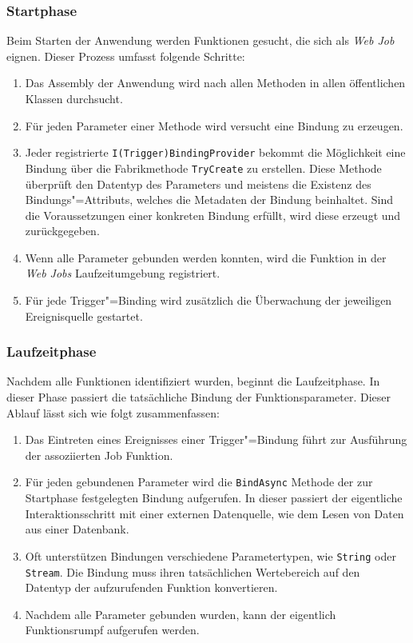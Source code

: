 \subsubsection{Startphase}

Beim Starten der Anwendung werden Funktionen gesucht, die sich als \textit{Web Job} eignen. Dieser Prozess umfasst folgende Schritte:

\begin{enumerate}
	\item Das Assembly der Anwendung wird nach allen Methoden in allen öffentlichen Klassen durchsucht.
	\item Für jeden Parameter einer Methode wird versucht eine Bindung zu erzeugen.
	\item Jeder registrierte \lstinline{I(Trigger)BindingProvider} bekommt die Möglichkeit eine Bindung über die Fabrikmethode \lstinline{TryCreate} zu erstellen. Diese Methode überprüft den Datentyp des Parameters und meistens die Existenz des Bindungs"=Attributs, welches die Metadaten der Bindung beinhaltet. Sind die Voraussetzungen einer konkreten Bindung erfüllt, wird diese erzeugt und zurückgegeben.
	\item Wenn alle Parameter gebunden werden konnten, wird die Funktion in der \textit{Web Jobs} Laufzeitumgebung registriert.
	\item Für jede Trigger"=Binding wird zusätzlich die Überwachung der jeweiligen Ereignisquelle gestartet.
\end{enumerate}

\subsubsection{Laufzeitphase}

Nachdem alle Funktionen identifiziert wurden, beginnt die Laufzeitphase. In dieser Phase passiert die tatsächliche Bindung der Funktionsparameter. Dieser Ablauf lässt sich wie folgt zusammenfassen:

\begin{enumerate}
	\item Das Eintreten eines Ereignisses einer Trigger"=Bindung führt zur Ausführung der assoziierten Job Funktion.
	\item Für jeden gebundenen Parameter wird die \lstinline{BindAsync} Methode der zur Startphase festgelegten Bindung aufgerufen. In dieser passiert der eigentliche Interaktionsschritt mit einer externen Datenquelle, wie \zB dem Lesen von Daten aus einer Datenbank.
	\item Oft unterstützen Bindungen verschiedene Parametertypen, wie \zB \lstinline{String} oder \lstinline{Stream}. Die Bindung muss ihren tatsächlichen Wertebereich auf den Datentyp der aufzurufenden Funktion konvertieren.
	\item Nachdem alle Parameter gebunden wurden, kann der eigentlich Funktionsrumpf aufgerufen werden.
\end{enumerate}

